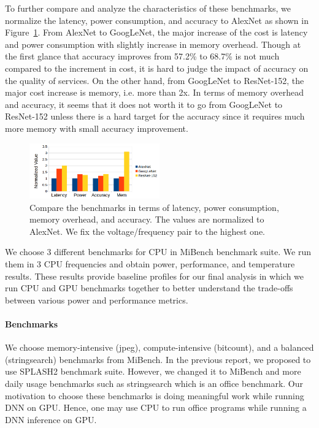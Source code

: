 To further compare and analyze the characteristics of these benchmarks, we normalize the latency, power consumption, and accuracy to AlexNet as shown in Figure~\ref{fig:3}. From AlexNet to GoogLeNet, the major increase of the cost is latency and power consumption with slightly increase in memory overhead. Though at the first glance that accuracy improves from 57.2\% to 68.7\% is not much compared to the increment in cost, it is hard to judge the impact of accuracy on the quality of services. On the other hand, from GoogLeNet to ResNet-152, the major cost increase is memory, i.e. more than 2x. In terms of memory overhead and accuracy, it seems that it does not worth it to go from GoogLeNet to ResNet-152 unless there is a hard target for the accuracy since it requires much more memory with small accuracy improvement.

\begin{figure}[h]
    \centering
    \includegraphics[width=0.5\textwidth]{benchmark_compare.png}
    \caption{Compare the benchmarks in terms of latency, power consumption, memory overhead, and accuracy. The values are normalized to AlexNet. We fix the voltage/frequency pair to the highest one.}\label{fig:3}
\end{figure}


We choose 3 different benchmarks for CPU in MiBench benchmark suite. We run them in 3 CPU frequencies and obtain power, performance, and temperature results. These results provide baseline profiles for our final analysis in which we run CPU and GPU benchmarks together to better understand the trade-offs between various power and performance metrics.

\paragraph{Benchmarks}


We choose memory-intensive (jpeg), compute-intensive (bitcount), and a balanced (stringsearch) benchmarks from MiBench. In the previous report, we proposed to use SPLASH2 \cite{woo1995splash} benchmark suite. However, we changed it to MiBench and more daily usage benchmarks such as stringsearch which is an office benchmark. Our motivation to choose these benchmarks is doing meaningful work while running DNN on GPU. Hence, one may use CPU to run office programs while running a DNN inference on GPU. 

